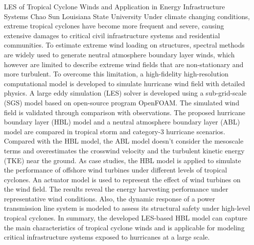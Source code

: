 \begin{addmargin}[2em]{0em}
\vspace{1.5ex}
\abs
{LES of Tropical Cyclone Winds and Application in Energy Infrastructure Systems}
{Chao Sun}
{Louisiana State University}
{Under climate changing conditions, extreme tropical cyclones have become more frequent and severe, causing extensive damages to critical civil infrastructure systems and residential communities. To estimate extreme wind loading on structures, spectral methods are widely used to generate neutral atmosphere boundary layer winds, which however are limited to describe extreme wind fields that are non-stationary and more turbulent. To overcome this limitation, a high-fidelity high-resolution computational model is developed to simulate hurricane wind field with detailed physics. A large eddy simulation (LES) solver is developed using a sub-grid-scale (SGS) model based on open-source program OpenFOAM. The simulated wind field is validated through comparison with observations. The proposed hurricane boundary layer (HBL) model and a neutral atmosphere boundary layer (ABL) model are compared in tropical storm and category-3 hurricane scenarios. Compared with the HBL model, the ABL model doesn’t consider the mesoscale terms and overestimates the crosswind velocity and the turbulent kinetic energy (TKE) near the ground. As case studies, the HBL model is applied to simulate the performance of offshore wind turbines under different levels of tropical cyclones. An actuator model is used to represent the effect of wind turbines on the wind field. The results reveal the energy harvesting performance under representative wind conditions. Also, the dynamic response of a power transmission line system is modeled to assess its structural safety under high-level tropical cyclones. In summary, the developed LES-based HBL model can capture the main characteristics of tropical cyclone winds and is applicable for modeling critical infrastructure systems exposed to hurricanes at a large scale.}


\end{addmargin}
